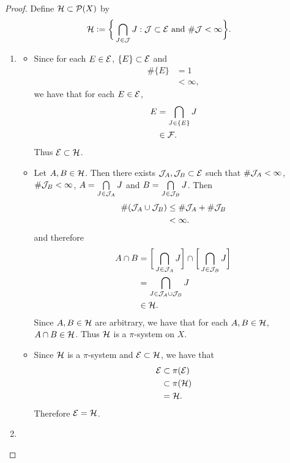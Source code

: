 \documentclass{book}
\begin{document}
	\begin{proof}
		Define $\mathcal{H} \subset \mathcal{P}(X)$ by 
		$$\mathcal{H} \vcentcolon= \bigg \{ \bigcap\limits_{J \in \mathcal{J}}J: \text{$\mathcal{J} \subset \mathcal{E}$ and $\# \mathcal{J} < \infty$}  \bigg\}.$$ 
		\begin{enumerate}
			\item 
			\begin{itemize}
				\item Since for each $E \in \mathcal{E}$, $\{E\} \subset \mathcal{E}$ and 
				\begin{align*}
					\#\{E\} 
					& =1 \\
					& < \infty,
				\end{align*} 
				we have that for each $E \in \mathcal{E}$, 
				\begin{align*}
					E
					& = \bigcap\limits_{J \in \{E\}}J \\
					& \in \mathcal{F}.
				\end{align*}
				Thus $\mathcal{E} \subset \mathcal{H}$. 
				\item Let $A,B \in \mathcal{H}$. Then there exists $\mathcal{J}_A, \mathcal{J}_B \subset \mathcal{E}$ such that $\# \mathcal{J}_A < \infty$, $\# \mathcal{J}_B < \infty$, $A =  \bigcap\limits_{J \in \mathcal{J}_A}J$ and $B = \bigcap\limits_{J \in \mathcal{J}_B} J$. Then 
				\begin{align*}
					\# (\mathcal{J}_A \cup \mathcal{J}_B) 
					& \leq \# \mathcal{J}_A + \# \mathcal{J}_B \\
					& < \infty.  
				\end{align*} 
				and therefore
				\begin{align*}
					A \cap B
					& = \bigg[ \bigcap\limits_{J \in \mathcal{J}_A}J \bigg] \cap \bigg[ \bigcap\limits_{J \in \mathcal{J}_B} J \bigg] \\
					& = \bigcap\limits_{J \in \mathcal{J}_A \cup \mathcal{J}_B} J \\
					& \in \mathcal{H}.
				\end{align*} 
				Since $A,B \in \mathcal{H}$ are arbitrary, we have that for each $A,B \in \mathcal{H}$, $A \cap B \in \mathcal{H}$. Thus $\mathcal{H}$ is a $\pi$-system on $X$. 
				\item Since $\mathcal{H}$ is a $\pi$-system and $\mathcal{E} \subset \mathcal{H}$, we have that 
				\begin{align*}
					\mathcal{E}
					& \subset \pi(\mathcal{E}) \\
					& \subset \pi(\mathcal{H}) \\
					& = \mathcal{H}. 
				\end{align*} 
				Therefore $\mathcal{E} = \mathcal{H}$.
			\end{itemize}
			\item {}
		\end{enumerate}
	\end{proof}
	
\end{document}
